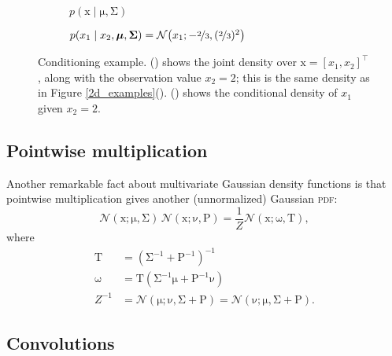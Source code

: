 \documentclass{article}
\newcommand{\acro}[1]{\textsc{\MakeLowercase{#1}}}
\newcommand{\given}{\mid}
\newcommand{\mc}[1]{\mathcal{#1}}
\newcommand{\inv}{^{-1}}
\newcommand{\trans}{^\top}
\newcommand{\mat}[1]{\bm{\mathrm{#1}}}
\renewcommand{\vec}[1]{\bm{\mathrm{#1}}}
\begin{document}
\begin{figure}
  \centering
  \begin{subfigure}[t]{0.49\textwidth}
    
    \caption{$p(\vec{x} \given \vec{\mu}, \mat{\Sigma})$}
    \label{conditional_2d_pdf}
  \end{subfigure}
  \begin{subfigure}[t]{0.49\textwidth}
    
    \caption{$p(x_1 \given x_2, \vec{\mu}, \mat{\Sigma}) =
      \mc{N}\bigl(x_1; -\nicefrac{2}{3}, (\nicefrac{2}{3})^2\bigr)$}
    \label{conditional_pdf}
  \end{subfigure}
  \caption{Conditioning example.  () shows
    the joint density over $\vec{x} = [x_1, x_2]\trans$, along with
    the observation value $x_2 = 2$; this is the same density as in
    Figure \ref{2d_examples}().
    () shows the conditional density of
    $x_1$ given $x_2 = 2$.}
  \label{conditional_example}
\end{figure}

\subsection*{Pointwise multiplication}

Another remarkable fact about multivariate Gaussian density functions
is that pointwise multiplication gives another (unnormalized) Gaussian
\acro{PDF}:
\begin{equation*}
  \mc{N}(\vec{x}; \vec{\mu}, \mat{\Sigma})
  \,
  \mc{N}(\vec{x}; \vec{\nu}, \mat{P})
  =
  \frac{1}{Z}
  \mc{N}(\vec{x}; \vec{\omega}, \mat{T}),
\end{equation*}
where
\begin{align*}
  \mat{T}
  &=
  (\mat{\Sigma}\inv + \mat{P}\inv)\inv \\
  \vec{\omega}
  &=
  \mat{T}
  (\mat{\Sigma}\inv \vec{\mu} +
  \mat{P}\inv \vec{\nu}) \\
  Z^{-1}
  &=
  \mc{N}(\vec{\mu}; \vec{\nu}, \mat{\Sigma} + \mat{P})
  =
  \mc{N}(\vec{\nu}; \vec{\mu}, \mat{\Sigma} + \mat{P}).
\end{align*}

\subsection*{Convolutions}
\end{document}
